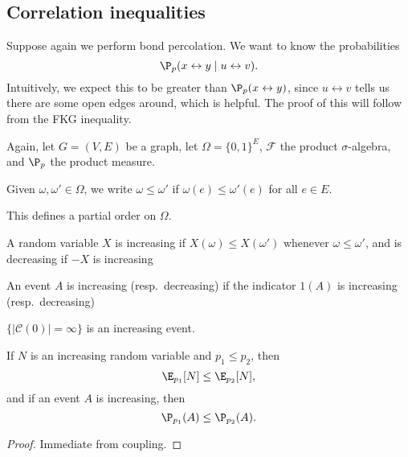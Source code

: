 \documentclass[a4paper]{article}
\begin{document}
\subsection{Correlation inequalities}
Suppose again we perform bond percolation. We want to know the probabilities
\[
  \P_p(x \leftrightarrow y \mid u \leftrightarrow v).
\]
Intuitively, we expect this to be greater than $\P_p(x \leftrightarrow y)$, since $u \leftrightarrow v$ tells us there are some open edges around, which is helpful. The proof of this will follow from the FKG inequality.

Again, let $G = (V, E)$ be a graph, let $\Omega = \{0, 1\}^E$, $\mathcal{F}$ the product $\sigma$-algebra, and $\P_p$ the product measure.

\begin{defi}[$\leq$]\index{$\leq$}
  Given $\omega, \omega' \in \Omega$, we write $\omega \leq \omega'$ if $\omega(e) \leq \omega'(e)$ for all $e \in E$.
\end{defi}
This defines a partial order on $\Omega$.

\begin{defi}
  A random variable $X$ is increasing if $X(\omega) \leq X(\omega')$ whenever $\omega \leq \omega'$, and is decreasing if $-X$ is increasing
\end{defi}

\begin{defi}
  An event $A$ is increasing (resp.\ decreasing) if the indicator $1(A)$ is increasing (resp.\ decreasing)
\end{defi}

\begin{eg}
  $\{|\mathcal{C}(0)|= \infty\}$ is an increasing event.
\end{eg}

\begin{thm}
  If $N$ is an increasing random variable and $p_1 \leq p_2$, then
  \[
    \E_{p_1} [N] \leq \E_{p_2} [N],
  \]
  and if an event $A$ is increasing, then
  \[
    \P_{p_1}(A) \leq \P_{p_2}(A).
  \]
\end{thm}

\begin{proof}
  Immediate from coupling.
\end{proof}
\end{document}

